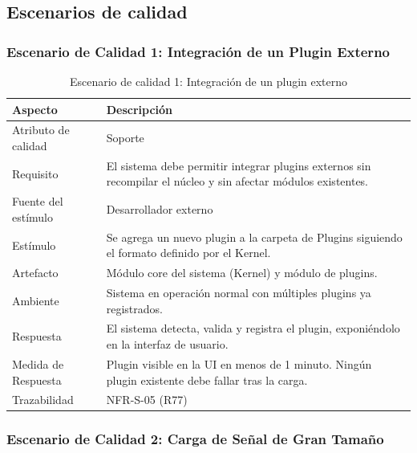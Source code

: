 \documentclass[11pt,a4paper]{article}
\DeclareRobustCommand{\_}{\textunderscore\allowbreak}
\begin{document}
\subsection{Escenarios de calidad}


\subsubsection{Escenario de Calidad 1: Integración de un Plugin Externo}

\begin{table}[H]
\centering
\caption{Escenario de calidad 1: Integración de un plugin externo}
\label{tab:escenario1}
\begin{tabularx}{\textwidth}{|l|X|}
\hline
\textbf{Aspecto} & \textbf{Descripción} \\
\hline
Atributo de calidad & Soporte \\
\hline
Requisito & El sistema debe permitir integrar plugins externos sin recompilar el núcleo y sin afectar módulos existentes. \\
\hline
Fuente del estímulo & Desarrollador externo \\
\hline
Estímulo & Se agrega un nuevo plugin a la carpeta de Plugins siguiendo el formato definido por el Kernel. \\
\hline
Artefacto & Módulo core del sistema (Kernel) y módulo de plugins. \\
\hline
Ambiente & Sistema en operación normal con múltiples plugins ya registrados. \\
\hline
Respuesta & El sistema detecta, valida y registra el plugin, exponiéndolo en la interfaz de usuario. \\
\hline
Medida de Respuesta & Plugin visible en la UI en menos de 1 minuto. Ningún plugin existente debe fallar tras la carga. \\
\hline
Trazabilidad & NFR-S-05 (R77) \\
\hline
\end{tabularx}
\end{table}

\subsubsection{Escenario de Calidad 2: Carga de Señal de Gran Tamaño}
\end{document}
